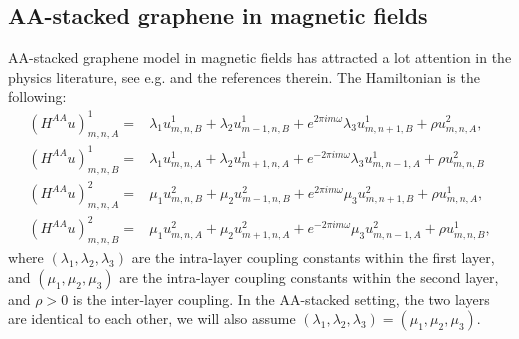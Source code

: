 \documentclass[11pt]{amsart}
\begin{document}
\subsection{AA-stacked graphene in magnetic fields} AA-stacked graphene model in magnetic fields has attracted a lot attention in the physics literature, see e.g. \cite{RSRN} and the references therein.
The Hamiltonian is the following: 
\begin{align*}
(H^{AA} u)^1_{m,n,A}=&\lambda_1 u^1_{m,n,B}+\lambda_2 u^1_{m-1,n,B}+e^{2\pi i m\omega}\lambda_3 u^1_{m,n+1,B}+\rho u^2_{m,n,A},\\
(H^{AA} u)^1_{m,n,B}=&\lambda_1 u^1_{m,n,A}+\lambda_2 u^1_{m+1,n,A}+e^{-2\pi i m\omega} \lambda_3 u^1_{m,n-1,A}+\rho u^2_{m,n,B}\\
(H^{AA} u)^2_{m,n,A}=&\mu_1 u^2_{m,n,B}+\mu_2 u^2_{m-1,n,B}+e^{2\pi i m\omega}\mu_3 u^2_{m,n+1,B}+\rho u^1_{m,n,A},\\
(H^{AA} u)^2_{m,n,B}=&\mu_1 u^2_{m,n,A}+\mu_2 u^2_{m+1,n,A}+e^{-2\pi i m\omega} \mu_3 u^2_{m,n-1,A}+\rho u^1_{m,n,B},
\end{align*}
where $(\lambda_1,\lambda_2,\lambda_3)$ are the intra-layer coupling constants within the first layer, and $(\mu_1,\mu_2,\mu_3)$ are the intra-layer coupling constants within the second layer, and $\rho>0$ is the inter-layer coupling. 
In the AA-stacked setting, the two layers are identical to each other, we will also assume $(\lambda_1,\lambda_2,\lambda_3)=(\mu_1,\mu_2,\mu_3)$. 
\end{document}
